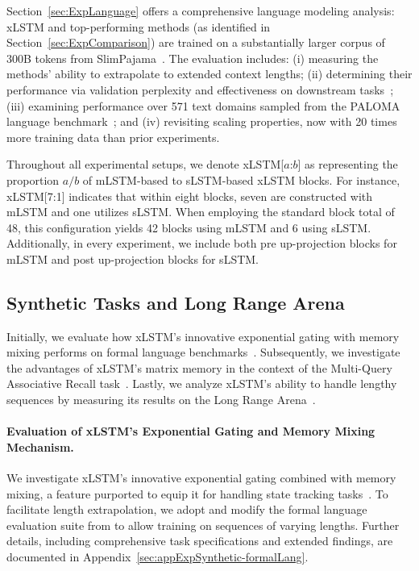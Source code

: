 Section~\ref{sec:ExpLanguage} offers a comprehensive language modeling analysis: xLSTM and top-performing methods (as identified in Section~\ref{sec:ExpComparison}) are trained on a substantially larger corpus of 300B tokens from SlimPajama~\citep{Soboleva:23}. The evaluation includes: (i) measuring the methods’ ability to extrapolate to extended context lengths; (ii) determining their performance via validation perplexity and effectiveness on downstream tasks~\citep{Sutawika:24}; (iii) examining performance over 571 text domains sampled from the PALOMA language benchmark~\citep{Magnusson:23arxivshort}; and (iv) revisiting scaling properties, now with 20 times more training data than prior experiments.

\label{sec:xlstm_blocks_notation}
Throughout all experimental setups, we denote xLSTM[$a$:$b$] as representing the proportion $a/b$ of mLSTM-based to sLSTM-based xLSTM blocks. For instance, xLSTM[7:1] indicates that within eight blocks, seven are constructed with mLSTM and one utilizes sLSTM. When employing the standard block total of 48, this configuration yields 42 blocks using mLSTM and 6 using sLSTM. Additionally, in every experiment, we include both pre up-projection blocks for mLSTM and post up-projection blocks for sLSTM.

\subsection{Synthetic Tasks and Long Range Arena}
\label{sec:ExpSyntethic}
Initially, we evaluate how xLSTM's innovative exponential gating with memory mixing performs on formal language benchmarks~\citep{Deletang:23}. Subsequently, we investigate the advantages of xLSTM's matrix memory in the context of the Multi-Query Associative Recall task~\citep{Arora:23arxiv}. Lastly, we analyze xLSTM's ability to handle lengthy sequences by measuring its results on the Long Range Arena~\citep{Tay:21}.

\paragraph{Evaluation of xLSTM’s Exponential Gating and Memory Mixing Mechanism.} We investigate xLSTM’s innovative exponential gating combined with memory mixing, a feature purported to equip it for handling state tracking tasks~\citep{Merrill:24, Merrill:23}. To facilitate length extrapolation, we adopt and modify the formal language evaluation suite from \citet{Deletang:23} to allow training on sequences of varying lengths. Further details, including comprehensive task specifications and extended findings, are documented in Appendix~\ref{sec:appExpSynthetic-formalLang}. 


